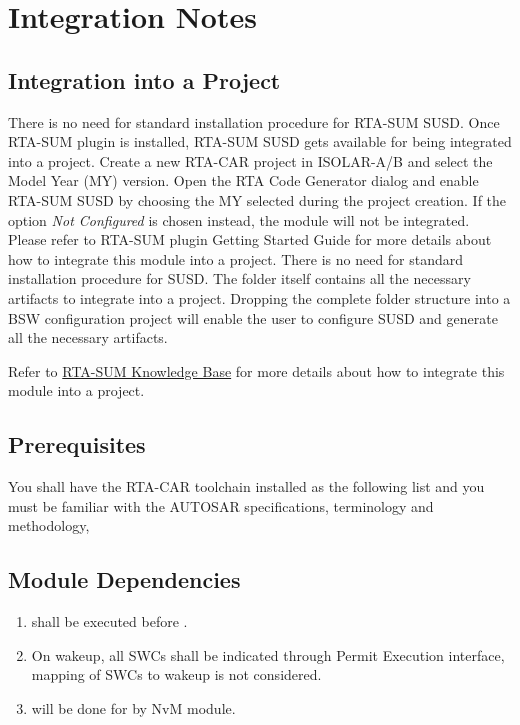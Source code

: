 \chapter{Integration Notes}

\section{Integration into a Project}
\ifnum {}
{There is no need for standard installation procedure for RTA-SUM SUSD. Once RTA-SUM plugin is installed,
RTA-SUM SUSD gets available for being integrated into a project. Create a new RTA-CAR project
in ISOLAR-A/B and select the Model Year (MY) version. Open the RTA Code Generator dialog and enable
RTA-SUM SUSD by choosing the MY selected during the project creation. If the option \textit{Not Configured}
is chosen instead, the module will not be integrated.\newline
Please refer to RTA-SUM plugin Getting Started Guide for more details about how to integrate this
module into a project.}
\else
{
There is no need for standard installation procedure for SUSD. The folder itself contains all the necessary
artifacts to integrate into a project. Dropping the complete folder structure into a BSW configuration
project will enable the user to configure SUSD and generate all the necessary artifacts.
}
\fi

Refer to \href {https://rtahotline.etas.com/confluence/display/RH/RTA-SUM} {RTA-SUM Knowledge Base} for more details about how to integrate this module into a project. 

\section{Prerequisites}
\label{sec:prerequisites}
You shall have the RTA-CAR toolchain installed as the following list and you must be familiar with the AUTOSAR specifications, terminology and methodology,


\section{Module Dependencies}
\begin{enumerate}
\item {} shall be executed before .
\item On wakeup, all SWCs shall be indicated through Permit Execution interface, mapping of SWCs to wakeup is not considered.
\item {} will be done for  by NvM module.
\end{enumerate}



